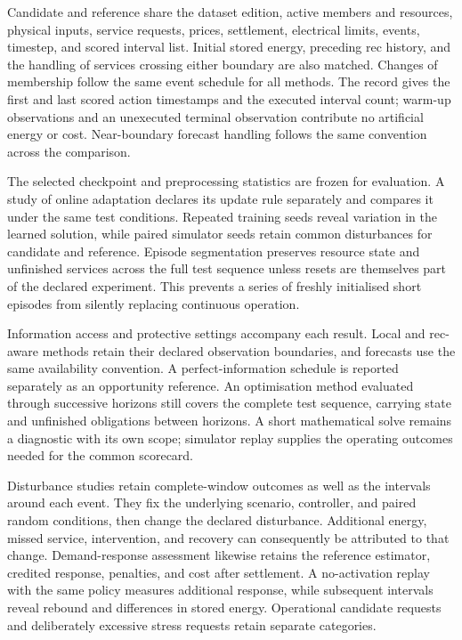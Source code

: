Candidate and reference share the dataset edition, active members and resources, physical inputs, service requests, prices, settlement, electrical limits, events, timestep, and scored interval list. Initial stored energy, preceding \gls{rec} history, and the handling of services crossing either boundary are also matched. Changes of membership follow the same event schedule for all methods. The record gives the first and last scored action timestamps and the executed interval count; warm-up observations and an unexecuted terminal observation contribute no artificial energy or cost. Near-boundary forecast handling follows the same convention across the comparison.

The selected checkpoint and preprocessing statistics are frozen for evaluation. A study of online adaptation declares its update rule separately and compares it under the same test conditions. Repeated training seeds reveal variation in the learned solution, while paired simulator seeds retain common disturbances for candidate and reference. Episode segmentation preserves resource state and unfinished services across the full test sequence unless resets are themselves part of the declared experiment. This prevents a series of freshly initialised short episodes from silently replacing continuous operation.

Information access and protective settings accompany each result. Local and \gls{rec}-aware methods retain their declared observation boundaries, and forecasts use the same availability convention. A perfect-information schedule is reported separately as an opportunity reference. An optimisation method evaluated through successive horizons still covers the complete test sequence, carrying state and unfinished obligations between horizons. A short mathematical solve remains a diagnostic with its own scope; simulator replay supplies the operating outcomes needed for the common scorecard.

Disturbance studies retain complete-window outcomes as well as the intervals around each event. They fix the underlying scenario, controller, and paired random conditions, then change the declared disturbance. Additional energy, missed service, intervention, and recovery can consequently be attributed to that change. Demand-response assessment likewise retains the reference estimator, credited response, penalties, and cost after settlement. A no-activation replay with the same policy measures additional response, while subsequent intervals reveal rebound and differences in stored energy. Operational candidate requests and deliberately excessive stress requests retain separate categories.

